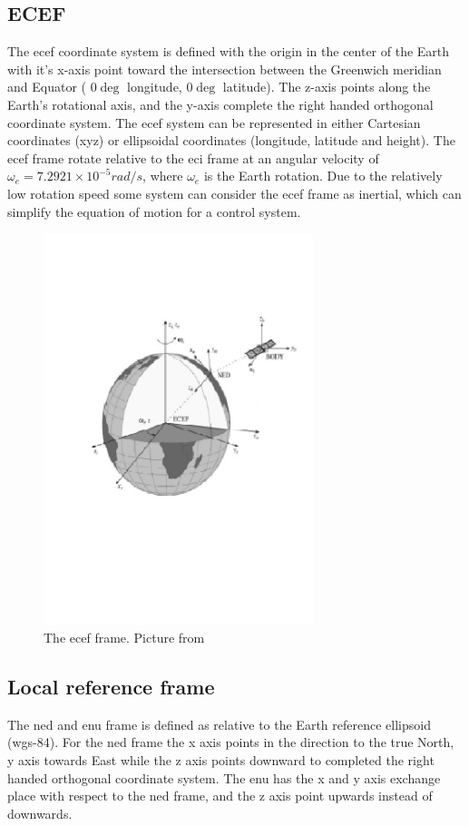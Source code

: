 \subsection{ECEF}\label{ss:ECEF}
The \acrfull{ecef} coordinate system is defined with the origin in the center of the Earth with it's x-axis point toward the intersection between the Greenwich meridian and Equator ( $0\deg $ longitude, $0\deg $ latitude). The z-axis points along the Earth's rotational axis, and the y-axis complete the right handed orthogonal coordinate system. The \gls{ecef} system can be represented in either Cartesian coordinates (xyz) or ellipsoidal coordinates (longitude, latitude and height). The \gls{ecef} frame rotate relative to the \gls{eci} frame at an angular velocity of $\omega_e = 7.2921 \times 10^{-5}rad/s$, where $\omega_e$ is the Earth rotation. Due to the relatively low rotation speed some system can consider the \gls{ecef} frame as inertial, which can simplify the equation of motion for a control system.
\begin{figure}[H]
	\centering
		\includegraphics[width=0.7\textwidth]{figs/ECEF-Frame.jpg}
		\caption{The \gls{ecef} frame. Picture from \citep{fossen2011handbook}}
		\label{figure:ECEF}
\end{figure}
\subsection{Local reference frame}
The \gls{ned} and \gls{enu} frame is defined as relative to the Earth reference ellipsoid (\gls{wgs-84}). For the \gls{ned} frame the x axis points in the direction to the true North, y axis towards East while the z axis points downward to completed the right handed orthogonal coordinate system. The \gls{enu} has the x and y axis exchange place with respect to the \gls{ned} frame, and the z axis point upwards instead of downwards.

